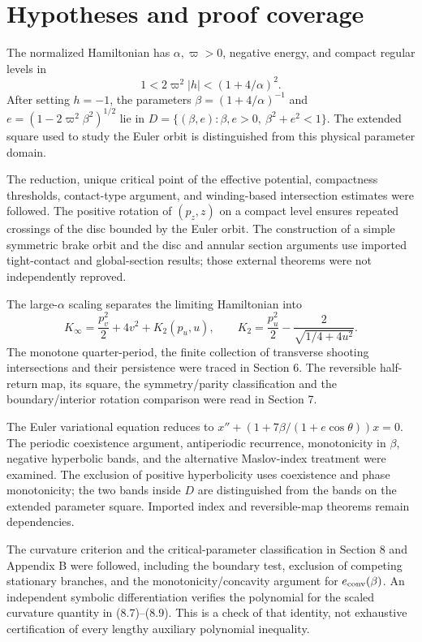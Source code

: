 \documentclass[10pt]{article}
\begin{document}
\section*{Hypotheses and proof coverage}
The normalized Hamiltonian has \(\alpha,\varpi>0\), negative energy, and compact regular levels in \[1<2\varpi^2|h|<(1+4/\alpha)^2.\] After setting \(h=-1\), the parameters \(\beta=(1+4/\alpha)^{-1}\) and \(e=(1-2\varpi^2\beta^2)^{1/2}\) lie in \(D=\{(\beta,e):\beta,e>0,\ \beta^2+e^2<1\}\). The extended square used to study the Euler orbit is distinguished from this physical parameter domain.\par
The reduction, unique critical point of the effective potential, compactness thresholds, contact-type argument, and winding-based intersection estimates were followed. The positive rotation of \((p_z,z)\) on a compact level ensures repeated crossings of the disc bounded by the Euler orbit. The construction of a simple symmetric brake orbit and the disc and annular section arguments use imported tight-contact and global-section results; those external theorems were not independently reproved.\par
The large-\(\alpha\) scaling separates the limiting Hamiltonian into \[K_\infty=\frac{p_v^2}{2}+4v^2+K_2(p_u,u),\qquad
 K_2=\frac{p_u^2}{2}-\frac{2}{\sqrt{1/4+4u^2}}.\] The monotone quarter-period, the finite collection of transverse shooting intersections and their persistence were traced in Section 6. The reversible half-return map, its square, the symmetry/parity classification and the boundary/interior rotation comparison were read in Section 7.\par
The Euler variational equation reduces to \(x''+(1+7\beta/(1+e\cos\theta))x=0\). The periodic coexistence argument, antiperiodic recurrence, monotonicity in \(\beta\), negative hyperbolic bands, and the alternative Maslov-index treatment were examined. The exclusion of positive hyperbolicity uses coexistence and phase monotonicity; the two bands inside \(D\) are distinguished from the bands on the extended parameter square. Imported index and reversible-map theorems remain dependencies.\par
The curvature criterion and the critical-parameter classification in Section 8 and Appendix B were followed, including the boundary test, exclusion of competing stationary branches, and the monotonicity/concavity argument for \(e_{\rm conv}(\beta)\). An independent symbolic differentiation verifies the polynomial for the scaled curvature quantity in (8.7)–(8.9). This is a check of that identity, not exhaustive certification of every lengthy auxiliary polynomial inequality.\par
\end{document}
